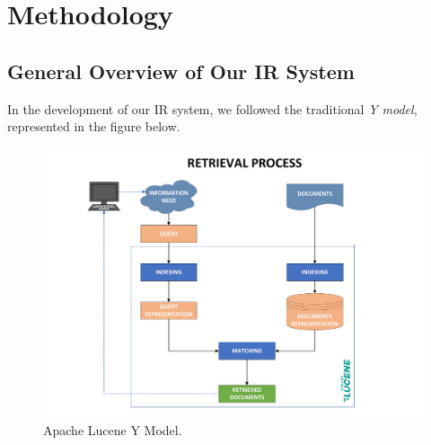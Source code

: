 \section{Methodology}
\label{sec:methodology}

\subsection{General Overview of Our IR System}
In the development of our \ac{IR} system, we followed the traditional \textit{Y model}, represented in the figure below.

\begin{figure}[!h]
    \centering
    \includegraphics[width=0.9\linewidth]{figure/Y.pdf} 
    \caption{Apache Lucene Y Model.}
    \label{fig:lucene_yModel}
\end{figure}

